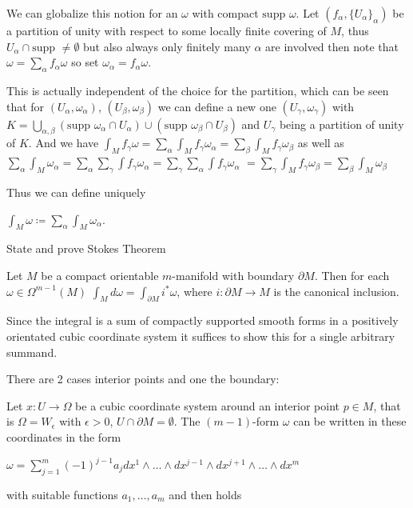We can globalize this notion for an \( \omega \) with compact \( \text{supp } \omega \). Let \( (f_\alpha, \{U_\alpha\}_{\alpha}) \) be a partition of unity 
with respect to some locally finite covering of \( M \), thus \( U_\alpha \cap \text{supp } \neq \emptyset \) but also always only finitely many \( \alpha \)
are involved then note that
\( \omega = \sum_\alpha f_\alpha \omega \)
so set \( \omega_\alpha = f_\alpha \omega \).

This is actually independent of the choice for the partition, which can be seen that for \( (U_\alpha, \omega_\alpha) \), \( (U_\beta, \omega_\beta) \)
we can define a new one \((U_\gamma, \omega_\gamma) \) with \( K = \bigcup_{\alpha, \beta} (\text{supp } \omega_\alpha \cap U_\alpha) \cup (\text{supp } \omega_\beta \cap U_\beta) \) and \( U_\gamma \) being a partition of unity of \( K \).
And we have
\( \int_M f_\gamma \omega = \sum_\alpha \int_M f_\gamma \omega_\alpha = \sum_\beta \int_M f_\gamma \omega_\beta \)
as well as
\( \sum_\alpha \int_M \omega_\alpha = \sum_\alpha \sum_\gamma \int f_\gamma \omega_\alpha = \sum_\gamma \sum_\alpha \int f_\gamma \omega_\alpha \)
\( = \sum_\gamma \int_M f_\gamma \omega_\beta = \sum_\beta \int_M \omega_\beta\)

Thus we can define uniquely

\( \int_M \omega \coloneqq \sum_\alpha \int_M \omega_\alpha \).


State and prove Stokes Theorem

Let \( M \) be a compact orientable \( m \)-manifold with boundary \( \partial M \).
Then for each \( \omega \in \Omega^{m-1}(M) \)
\( \int_M d\omega = \int_{\partial M} i^\ast \omega \),
where \( i : \partial M \to M \) is the canonical inclusion.

Since the integral is a sum of compactly supported smooth forms in a positively
orientated cubic coordinate system it suffices to show this for a single arbitrary summand.

There are 2 cases interior points and one the boundary:

Let \( x: U \to \Omega \) be a cubic coordinate system around an interior point \( p \in M \), 
that is \(\Omega = W_\epsilon \) with \(\epsilon > 0 \), \(U \cap \partial M = \emptyset\). 
The \((m-1)\)-form \(\omega\) can be written in these coordinates in the form

\(\omega = \sum_{j=1}^m (-1)^{j-1} a_j dx^1 \wedge \dots \wedge dx^{j-1} \wedge dx^{j+1} \wedge \dots \wedge dx^m \)

with suitable functions \(a_1, \dots, a_m\) and then holds

